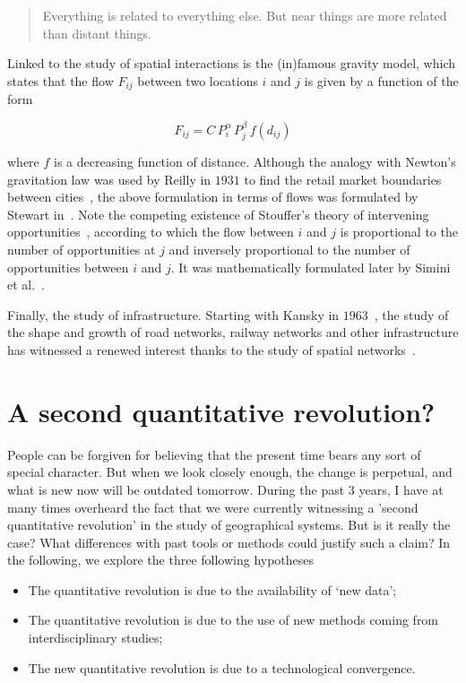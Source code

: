 \begin{quote}
    Everything is related to everything else. But near things
    are more related than distant things.
\end{quote}

Linked to the study of spatial interactions is the (in)famous gravity model,
which states that the flow $F_{ij}$ between two locations $i$ and $j$ is given
by a function of the form

\begin{equation}
    F_{ij} = C\, P_i^\alpha\,P_j^\beta\, f(d_{ij})
\end{equation}

where $f$ is a decreasing function of distance. Although the analogy with
Newton's gravitation law was used by Reilly in $1931$ to find the retail market
boundaries between cities~\cite{Reilly:1931}, the above formulation in terms of
flows was formulated by Stewart in~\cite{Stewart:1948}. Note the competing
existence of Stouffer's theory of intervening
opportunities~\cite{Stouffer:1940}, according to which the flow between $i$ and
$j$ is proportional to the number of opportunities at $j$ and inversely
proportional to the number of opportunities between $i$ and $j$. It was
mathematically formulated later by Simini et al.~\cite{Simini:2012}.

Finally, the study of infrastructure. Starting with Kansky in
$1963$~\cite{Kansky:1963}, the study of the shape and growth of road networks,
railway networks and other infrastructure has witnessed a renewed interest
thanks to the study of spatial networks~\cite{Barthelemy:2011}.


\section{A second quantitative revolution?}
\label{sec:a_second_quantitative_revolution_}

People can be forgiven for believing that the present time bears any sort of
special character. But when we look closely enough, the change is perpetual, and
what is new now will be outdated tomorrow. During the past $3$ years, I have
at many times overheard the fact that we were currently witnessing a 'second
quantitative revolution' in the study of geographical systems. But is it really
the case? What differences with past tools or methods could justify such a
claim? In the following, we explore the three following hypotheses

\begin{itemize}
    \item The quantitative revolution is due to the availability of `new data';
    \item The quantitative revolution is due to the use of new methods coming
        from interdisciplinary studies;
    \item The new quantitative revolution is due to a technological convergence.      
\end{itemize}




